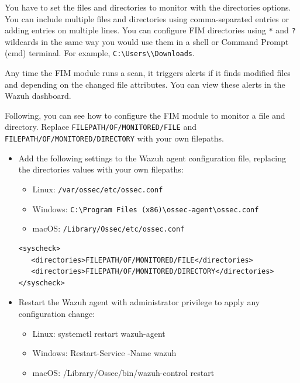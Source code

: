 You have to set the files and directories to monitor with the directories options. You can include multiple files and directories using comma-separated entries or adding entries on multiple lines. You can configure FIM directories using \texttt{*} and \texttt{?} wildcards in the same way you would use them in a shell or Command Prompt (cmd) terminal. For example, \texttt{C:\textbackslash Users\textbackslash *\textbackslash Downloads}.

Any time the FIM module runs a scan, it triggers alerts if it finds modified files and depending on the changed file attributes. You can view these alerts in the Wazuh dashboard.

Following, you can see how to configure the FIM module to monitor a file and directory. Replace \texttt{FILEPATH/OF/MONITORED/FILE} and \texttt{FILEPATH/OF/MONITORED/DIRECTORY} with your own filepaths.

\begin{itemize}
    \item Add the following settings to the Wazuh agent configuration file, replacing the directories values with your own filepaths:
          \begin{itemize}
              \item Linux: \texttt{/var/ossec/etc/ossec.conf}
              \item Windows: \texttt{C:\textbackslash Program Files (x86)\textbackslash ossec-agent\textbackslash ossec.conf}
              \item macOS: \texttt{/Library/Ossec/etc/ossec.conf}
          \end{itemize}
          \begin{verbatim}
<syscheck>
   <directories>FILEPATH/OF/MONITORED/FILE</directories>
   <directories>FILEPATH/OF/MONITORED/DIRECTORY</directories>
</syscheck>
        \end{verbatim}


    \item Restart the Wazuh agent with administrator privilege to apply any configuration change:
          \begin{itemize}
              \item Linux: systemctl restart wazuh-agent
              \item Windows: Restart-Service -Name wazuh
              \item macOS: /Library/Ossec/bin/wazuh-control restart
          \end{itemize}
\end{itemize}

